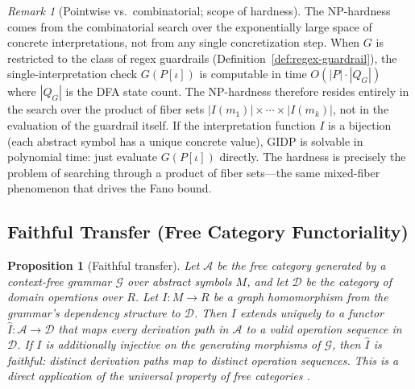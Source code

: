 \documentclass[letterpaper,twocolumn,10pt]{article}
\newtheorem{proposition}[theorem]{Proposition}
\theoremstyle{definition}
\theoremstyle{remark}
\newtheorem{remark}[theorem]{Remark}
\begin{document}
\begin{remark}[Pointwise vs.\ combinatorial; scope of hardness]
The NP-hardness comes from the combinatorial search over the exponentially large
space of concrete interpretations, not from any single concretization step.
When $G$ is restricted to the class of regex guardrails (Definition~\ref{def:regex-guardrail}),
the single-interpretation check $G(P[\iota])$ is computable in time
$O(|P| \cdot |Q_G|)$ where $|Q_G|$ is the DFA state count.
The NP-hardness therefore resides entirely in the search over the product of fiber
sets $|I(m_1)| \times \cdots \times |I(m_k)|$, not in the evaluation of the guardrail
itself.
If the interpretation function $I$ is a bijection (each abstract symbol has a
unique concrete value), \textsc{GIDP} is solvable in polynomial time: just evaluate
$G(P[\iota])$ directly.
The hardness is precisely the problem of searching through a product of fiber
sets---the same mixed-fiber phenomenon that drives the Fano bound.
\end{remark}

\subsection{Faithful Transfer (Free Category Functoriality)}\label{sec:functor}

\begin{proposition}[Faithful transfer]\label{thm:transfer}
Let $\mathcal{A}$ be the free category generated by a context-free grammar
$\mathcal{G}$ over abstract symbols $M$, and let $\mathcal{D}$ be the category of
domain operations over $R$.
Let $I\colon M \to R$ be a graph homomorphism from the grammar's dependency
structure to $\mathcal{D}$.
Then $I$ extends uniquely to a functor $\hat{I}\colon \mathcal{A} \to \mathcal{D}$
that maps every derivation path in $\mathcal{A}$ to a valid operation sequence in
$\mathcal{D}$.
If $I$ is additionally injective on the generating morphisms of $\mathcal{G}$, then
$\hat{I}$ is faithful: distinct derivation paths map to distinct operation sequences.
This is a direct application of the universal property of free categories \cite{maclane1971categories}.
\end{proposition}
\end{document}
